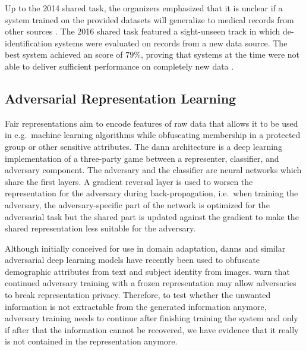 %
Up to the 2014 shared task, the organizers emphasized that it is unclear if a system trained on the provided datasets will generalize to medical records from other sources \citep{uzuner2007evaluating,stubbs2015automated}.
%
The 2016 shared task featured a sight-unseen track in which de-identification systems were evaluated on records from a new data source.
%
The best system achieved an \fone score of $79\%$, proving that systems at the time were not able to deliver sufficient performance on completely new data \citep{stubbs2017identification}.

\subsection{Adversarial Representation Learning}
%
Fair representations \citep{zemel2013learning,hamm2015preserving} aim to encode features of raw data that allows it to be used in e.g.\ machine learning algorithms while obfuscating membership in a protected group or other sensitive attributes.
%
The \ac{dann} architecture \citep{ganin2016domain} is a deep learning implementation of a three-party game between a representer, classifier, and adversary component.
%
The adversary and the classifier are neural networks which share the first layers.
%
A gradient reversal layer is used to worsen the representation for the adversary during back-propagation, i.e.\ when training the adversary, the adversary-specific part of the network is optimized for the adversarial task but the shared part is updated against the gradient to make the shared representation less suitable for the adversary.

%
Although initially conceived for use in domain adaptation, \acp{dann} and similar adversarial deep learning models have recently been used to obfuscate demographic attributes from text \citep{elazar2018adversarial,li2018towards} and subject identity \citep{feutry2018learning} from images.
%
\citet{elazar2018adversarial} warn that continued adversary training with a frozen representation may allow adversaries to break representation privacy. Therefore, to test whether the unwanted information is not extractable from the generated information anymore, adversary training needs to continue after finishing training the system and only if after that the information cannot be recovered, we have evidence that it really is not contained in the representation anymore.


